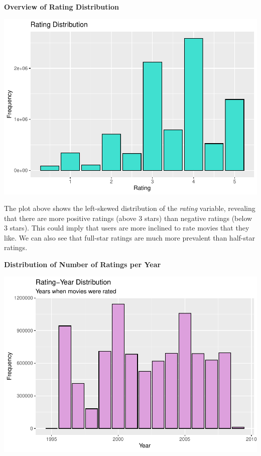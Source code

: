 \documentclass[
]{article}
\begin{document}
\textbf{Overview of Rating Distribution}

\begin{center}\includegraphics{MovieLens-Report_MitjaPrah_files/figure-latex/unnamed-chunk-22-1} \end{center}

The plot above shows the left-skewed distribution of the \emph{rating}
variable, revealing that there are more positive ratings (above 3 stars)
than negative ratings (below 3 stars). This could imply that users are
more inclined to rate movies that they like. We can also see that
full-star ratings are much more prevalent than half-star ratings.

\newpage

\textbf{Distribution of Number of Ratings per Year}

\begin{center}\includegraphics{MovieLens-Report_MitjaPrah_files/figure-latex/unnamed-chunk-23-1} \end{center}
\end{document}
